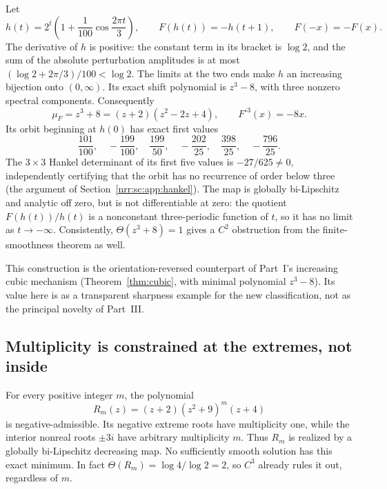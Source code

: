 \documentclass[11pt,letterpaper]{article}
\theoremstyle{definition}
\theoremstyle{remark}
\begin{document}
Let
\begin{equation}
 h(t)=2^t\left(1+\frac1{100}\cos\frac{2\pi t}{3}\right),
 \qquad F(h(t))=-h(t+1),\qquad F(-x)=-F(x).
 \label{nrr:dc:eq:cubic-example}
\end{equation}
The derivative of $h$ is positive: the constant term in its bracket
is $\log2$, and the sum of the absolute perturbation amplitudes is
at most $(\log2+2\pi/3)/100<\log2$.
The limits at the two ends make $h$ an increasing bijection onto
$(0,\infty)$. Its exact shift polynomial is $z^3-8$, with three
nonzero spectral components. Consequently
\begin{equation}
 \mu_F=z^3+8=(z+2)(z^2-2z+4),\qquad F^{\circ3}(x)=-8x.
 \label{nrr:dc:eq:cubic-minimum}
\end{equation}
Its orbit beginning at $h(0)$ has exact first values
\[
 \frac{101}{100},\quad-\frac{199}{100},\quad
 \frac{199}{50},\quad-\frac{202}{25},\quad
 \frac{398}{25},\quad-\frac{796}{25}.
\]
The $3\times3$ Hankel determinant of its first five values is
$-27/625\ne0$, independently certifying that the orbit has no
recurrence of order below three (the argument of
Section~\ref{nrr:sc:app:hankel}). The map is globally bi-Lipschitz
and analytic off zero, but is not differentiable at zero: the quotient
$F(h(t))/h(t)$ is a nonconstant three-periodic function of $t$, so it
has no limit as $t\to-\infty$. Consistently, $\Theta(z^3+8)=1$ gives a
$C^2$ obstruction from the finite-smoothness theorem as well.

This construction is the orientation-reversed counterpart of Part~I's
increasing cubic mechanism (Theorem~\ref{thm:cubic}, with minimal polynomial
$z^3-8$). Its value here is as a transparent sharpness example for the new
classification, not as the principal novelty of Part~III.

\subsection{Multiplicity is constrained at the extremes, not inside}

For every positive integer $m$, the polynomial
\begin{equation}
 R_m(z)=(z+2)(z^2+9)^m(z+4)
 \label{nrr:dc:eq:interior-multiplicity}
\end{equation}
is negative-admissible. Its negative extreme roots have multiplicity
one, while the interior nonreal roots $\pm3i$ have arbitrary
multiplicity $m$. Thus $R_m$ is realized by a globally bi-Lipschitz
decreasing map. No sufficiently smooth solution has this exact
minimum. In fact $\Theta(R_m)=\log4/\log2=2$, so $C^3$ already rules it
out, regardless of $m$.
\end{document}
